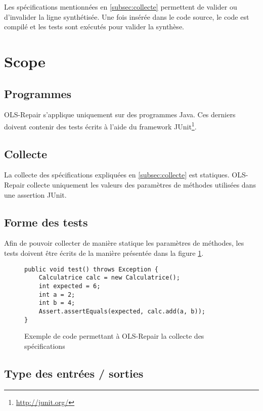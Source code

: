 \par Les spécifications mentionnées en \ref{subsec:collecte} permettent de valider ou d'invalider la ligne synthétisée. Une fois insérée dans le code source, le code est compilé et les tests sont exécutés pour valider la synthèse.





\section{Scope}
\label{sec:scope}

\subsection{Programmes}

OLS-Repair s'applique uniquement sur des programmes Java. Ces derniers doivent contenir des tests écrits à l'aide du framework JUnit\footnote{\url{http://junit.org/}}.


\subsection{Collecte}

La collecte des spécifications expliquées en \ref{subsec:collecte} est statiques. OLS-Repair collecte uniquement les valeurs des paramètres de méthodes utilisées dans une assertion JUnit.

\subsection{Forme des tests}

Afin de pouvoir collecter de manière statique les paramètres de méthodes, les tests doivent être écrits de la manière présentée dans la figure \ref{fig:forme_collecte}.

\begin{figure}[H]
\begin{lstlisting}
public void test() throws Exception {
    Calculatrice calc = new Calculatrice();
    int expected = 6;
    int a = 2;
    int b = 4;
    Assert.assertEquals(expected, calc.add(a, b));
}
\end{lstlisting}
\caption{Exemple de code permettant à OLS-Repair la collecte des spécifications}
\label{fig:forme_collecte}
\end{figure}


\subsection{Type des entrées / sorties}


